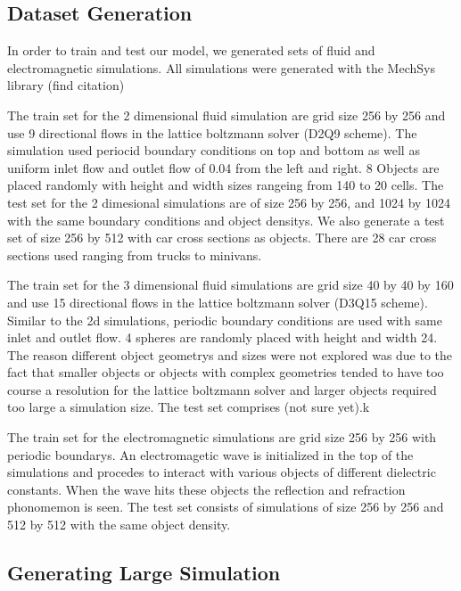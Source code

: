 \documentclass{article}
\begin{document}
\subsection{Dataset Generation}
In order to train and test our model, we generated sets of fluid and electromagnetic simulations. All simulations were generated with the MechSys library (find citation)

The train set for the 2 dimensional fluid simulation are grid size 256 by 256 and use 9 directional flows in the lattice boltzmann solver (D2Q9 scheme)\cite{guo2013lattice}. The simulation used periocid boundary conditions on top and bottom as well as uniform inlet flow and outlet flow of 0.04 from the left and right. 8 Objects are placed randomly with height and width sizes rangeing from 140 to 20 cells. The test set for the 2 dimesional simulations are of size 256 by 256, and 1024 by 1024 with the same boundary conditions and object densitys. We also generate a test set of size 256 by 512 with car cross sections as objects. There are 28 car cross sections used ranging from trucks to minivans.

The train set for the 3 dimensional fluid simulations are grid size 40 by 40 by 160 and use 15 directional flows in the lattice boltzmann solver (D3Q15 scheme)\cite{guo2013lattice}. Similar to the 2d simulations, periodic boundary conditions are used with same inlet and outlet flow. 4 spheres are randomly placed with height and width 24. The reason different object geometrys and sizes were not explored was due to the fact that smaller objects or objects with complex geometries tended to have too course a resolution for the lattice boltzmann solver and larger objects required too large a simulation size. The test set comprises (not sure yet).k

The train set for the electromagnetic simulations are grid size 256 by 256 with periodic boundarys. An electromagetic wave is initialized in the top of the simulations and procedes to interact with various objects of different dielectric constants. When the wave hits these objects the reflection and refraction phonomemon is seen. The test set consists of simulations of size 256 by 256 and 512 by 512 with the same object density.

\subsection{Generating Large Simulation}
\end{document}

